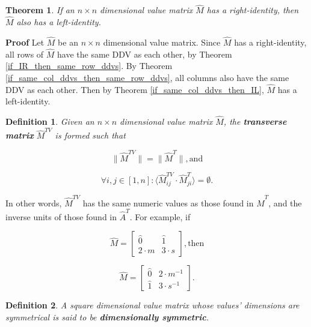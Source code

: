 \documentclass[10pt,letterpaper]{article}
\newtheorem{defn}{Definition}[section]
\newtheorem{thm}{Theorem}[section]
\newenvironment{proof}{\noindent\textbf{Proof} }{\qed \newline}
\newcommand{\qed}{\nobreak \ifvmode \relax \else
      \ifdim\lastskip<1.5em \hskip-\lastskip
      \hskip1.5em plus0em minus0.5em \fi \nobreak
      \vrule height0.75em width0.5em depth0.25em\fi}
\numberwithin{equation}{section}
\begin{document}
\begin{thm}If an $n \times n$ dimensional value matrix $\hat M$  has a
  right-identity, then $\hat M$ also has a left-identity.\end{thm}

\begin{proof}Let $\hat M$ be an $n \times n$ dimensional value matrix.
  Since $\hat M$ has a right-identity, all rows of $\hat M$ have the
  same DDV as each other, by Theorem \ref{if_IR_then_same_row_ddvs}.
  By Theorem \ref{if_same_col_ddvs_then_same_row_ddvs}, all columns
  also have the same DDV as each other.  Then by Theorem
  \ref{if_same_col_ddvs_then_IL}, $\hat M$ has a
  left-identity. \end{proof}

\begin{defn}Given an $n \times n$ dimensional value matrix $\hat M$,
  the \textbf{transverse matrix} $\hat M^{TV}$ is formed such that

\begin{equation} \label{transverse_definition_part_1} \| \hat M^{TV}
  \| = \| \hat M^T \| , \mbox{and} \end{equation}

\begin{equation} \label{transverse_definition_part_2} \forall i,j \in
  [1, n] : \langle \hat M^{TV}_{ij} \cdot \hat M^T_{ji} \rangle =
  \emptyset . \end{equation} \end{defn}

In other words, $\hat M^{TV}$ has the same numeric values as those
found in $\hat M^T$, and the inverse units of those found in $\hat
A^T$.  For example, if

\[ \hat M = \left[ \begin{matrix}
 \hat 0 & \hat 1 \\
 2 \cdot m & 3 \cdot s
 \end{matrix} \right] , \mbox{then} \]

\[ \hat M = \left[ \begin{matrix}
 \hat 0 & 2 \cdot m^{-1} \\
 \hat 1 & 3 \cdot s^{-1}
 \end{matrix} \right] . \]

\begin{defn}A square dimensional value matrix whose values' dimensions
  are symmetrical is said to be \textbf{dimensionally
    symmetric}. \end{defn}
\end{document}

